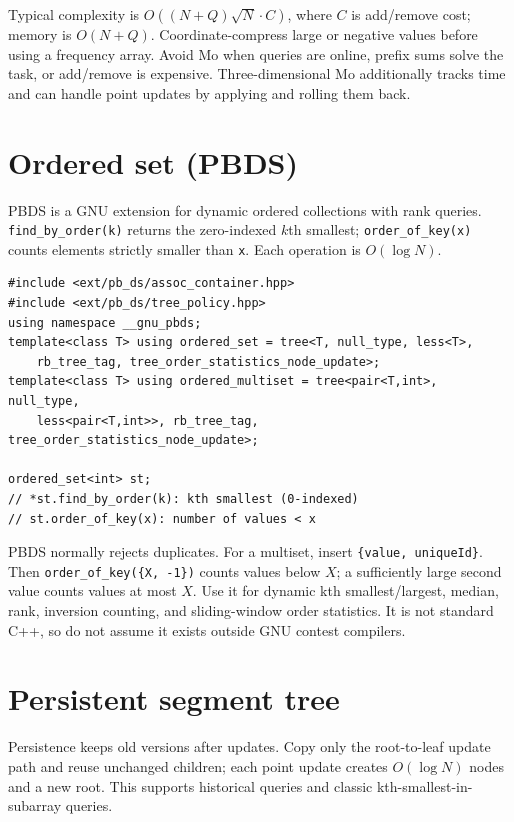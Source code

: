Typical complexity is $O((N+Q)\sqrt N \cdot C)$, where $C$ is add/remove cost; memory is $O(N+Q)$. Coordinate-compress large or negative values before using a frequency array. Avoid Mo when queries are online, prefix sums solve the task, or add/remove is expensive. Three-dimensional Mo additionally tracks time and can handle point updates by applying and rolling them back.

\section{Ordered set (PBDS)}

PBDS is a GNU extension for dynamic ordered collections with rank queries. \texttt{find\_by\_order(k)} returns the zero-indexed $k$th smallest; \texttt{order\_of\_key(x)} counts elements strictly smaller than \texttt{x}. Each operation is $O(\log N)$.

\begin{lstlisting}
#include <ext/pb_ds/assoc_container.hpp>
#include <ext/pb_ds/tree_policy.hpp>
using namespace __gnu_pbds;
template<class T> using ordered_set = tree<T, null_type, less<T>,
    rb_tree_tag, tree_order_statistics_node_update>;
template<class T> using ordered_multiset = tree<pair<T,int>, null_type,
    less<pair<T,int>>, rb_tree_tag, tree_order_statistics_node_update>;

ordered_set<int> st;
// *st.find_by_order(k): kth smallest (0-indexed)
// st.order_of_key(x): number of values < x
\end{lstlisting}

PBDS normally rejects duplicates. For a multiset, insert \texttt{\{value, uniqueId\}}. Then \texttt{order\_of\_key(\{X, -1\})} counts values below $X$; a sufficiently large second value counts values at most $X$. Use it for dynamic kth smallest/largest, median, rank, inversion counting, and sliding-window order statistics. It is not standard C++, so do not assume it exists outside GNU contest compilers.

\section{Persistent segment tree}

Persistence keeps old versions after updates. Copy only the root-to-leaf update path and reuse unchanged children; each point update creates $O(\log N)$ nodes and a new root. This supports historical queries and classic kth-smallest-in-subarray queries.

